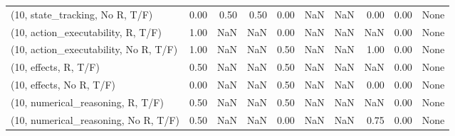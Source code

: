 \begin{table*}[h!]
\begin{adjustbox}{width=2\columnwidth,center}
\begin{tabular}{lrrr|rrr|rrr}
(10, state\_tracking, No R, T/F)       &                      0.00 &                  0.50 &                      0.50 &                          0.00 &                       NaN &                           NaN &                                   0.00 &                               0.00 &                                  None \\
(10, action\_executability, R, T/F)    &                      1.00 &                   NaN &                       NaN &                          0.00 &                       NaN &                           NaN &                                    NaN &                               0.00 &                                  None \\
(10, action\_executability, No R, T/F) &                      1.00 &                   NaN &                       NaN &                          0.50 &                       NaN &                           NaN &                                   1.00 &                               0.00 &                                  None \\
(10, effects, R, T/F)                 &                      0.50 &                   NaN &                       NaN &                          0.50 &                       NaN &                           NaN &                                    NaN &                               0.00 &                                  None \\
(10, effects, No R, T/F)              &                      0.00 &                   NaN &                       NaN &                          0.50 &                       NaN &                           NaN &                                   0.00 &                               0.00 &                                  None \\
(10, numerical\_reasoning, R, T/F)     &                      0.50 &                   NaN &                       NaN &                          0.50 &                       NaN &                           NaN &                                    NaN &                               0.00 &                                  None \\
(10, numerical\_reasoning, No R, T/F)  &                      0.50 &                   NaN &                       NaN &                          0.00 &                       NaN &                           NaN &                                   0.75 &                               0.00 &                                  None \\

\end{tabular}
\end{adjustbox}
\end{table*}
